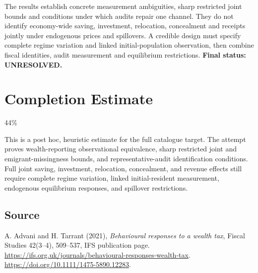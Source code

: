 \documentclass[11pt]{article}
\begin{document}
The results establish concrete measurement ambiguities, sharp restricted
joint bounds and conditions under which audits repair one channel.
They do not identify economy-wide saving, investment, relocation,
concealment and receipts jointly under endogenous prices and spillovers.
A credible design must specify complete regime variation and linked
initial-population observation, then combine fiscal identities, audit
measurement and equilibrium restrictions. \textbf{Final status: UNRESOLVED.}

\section{Completion Estimate}
44\%

This is a post hoc, heuristic estimate for the full catalogue target.
The attempt proves wealth-reporting observational equivalence, sharp restricted joint and emigrant-missingness bounds, and representative-audit identification conditions. Full joint saving, investment, relocation, concealment, and revenue effects still require complete regime variation, linked initial-resident measurement, endogenous equilibrium responses, and spillover restrictions.

\subsection*{Source}
A. Advani and H. Tarrant (2021), \emph{Behavioural responses to a wealth
tax}, Fiscal Studies 42(3--4), 509--537, IFS publication page.
\url{https://ifs.org.uk/journals/behavioural-responses-wealth-tax}.
\url{https://doi.org/10.1111/1475-5890.12283}.
\end{document}
